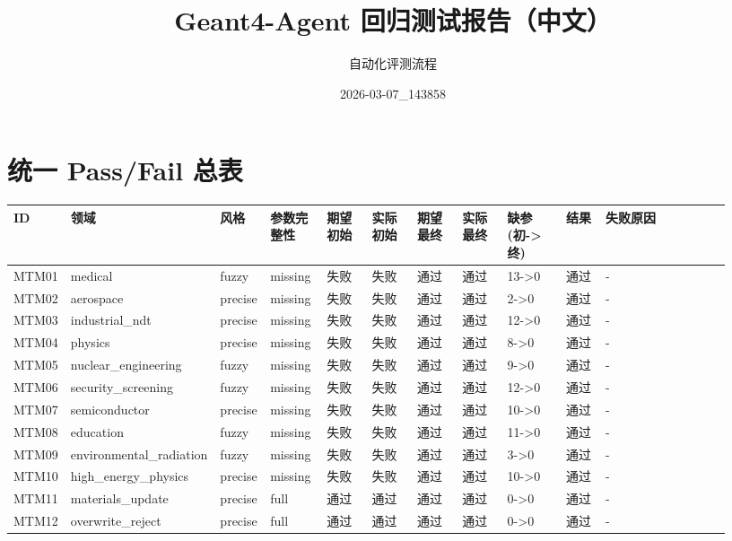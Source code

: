 \documentclass[11pt]{ctexart}
\title{Geant4-Agent 回归测试报告（中文）}
\author{自动化评测流程}
\date{2026-03-07\_143858}
\begin{document}
\maketitle
\section{统一 Pass/Fail 总表}
\begin{longtable}{p{0.06\linewidth}p{0.08\linewidth}p{0.07\linewidth}p{0.08\linewidth}p{0.07\linewidth}p{0.07\linewidth}p{0.07\linewidth}p{0.07\linewidth}p{0.09\linewidth}p{0.06\linewidth}p{0.21\linewidth}}
\toprule
ID & 领域 & 风格 & 参数完整性 & 期望初始 & 实际初始 & 期望最终 & 实际最终 & 缺参(初->终) & 结果 & 失败原因 \\
\midrule
MTM01 & medical & fuzzy & missing & 失败 & 失败 & 通过 & 通过 & 13->0 & 通过 & - \\
MTM02 & aerospace & precise & missing & 失败 & 失败 & 通过 & 通过 & 2->0 & 通过 & - \\
MTM03 & industrial\_ndt & precise & missing & 失败 & 失败 & 通过 & 通过 & 12->0 & 通过 & - \\
MTM04 & physics & precise & missing & 失败 & 失败 & 通过 & 通过 & 8->0 & 通过 & - \\
MTM05 & nuclear\_engineering & fuzzy & missing & 失败 & 失败 & 通过 & 通过 & 9->0 & 通过 & - \\
MTM06 & security\_screening & fuzzy & missing & 失败 & 失败 & 通过 & 通过 & 12->0 & 通过 & - \\
MTM07 & semiconductor & precise & missing & 失败 & 失败 & 通过 & 通过 & 10->0 & 通过 & - \\
MTM08 & education & fuzzy & missing & 失败 & 失败 & 通过 & 通过 & 11->0 & 通过 & - \\
MTM09 & environmental\_radiation & fuzzy & missing & 失败 & 失败 & 通过 & 通过 & 3->0 & 通过 & - \\
MTM10 & high\_energy\_physics & precise & missing & 失败 & 失败 & 通过 & 通过 & 10->0 & 通过 & - \\
MTM11 & materials\_update & precise & full & 通过 & 通过 & 通过 & 通过 & 0->0 & 通过 & - \\
MTM12 & overwrite\_reject & precise & full & 通过 & 通过 & 通过 & 通过 & 0->0 & 通过 & - \\
\bottomrule
\end{longtable}
\end{document}
